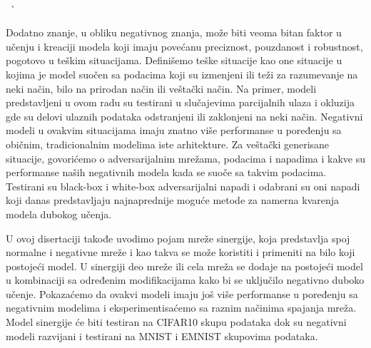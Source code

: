 \begin{tabbing}
\begin{minipage}[t]{.8\textwidth}
\end{minipage}\\

\ \`
\begin{minipage}[t]{.8\textwidth}
  Dodatno znanje, u obliku negativnog znanja, može biti veoma bitan faktor u učenju i kreaciji modela koji imaju povećanu preciznost, pouzdanost i robustnost, pogotovo u teškim situacijama. Definišemo teške situacije kao one situacije u kojima je model suočen sa podacima koji su izmenjeni ili teži za razumevanje na neki način, bilo na prirodan način ili veštački način. Na primer, modeli predstavljeni u ovom radu su testirani u slučajevima parcijalnih ulaza i okluzija gde su delovi ulaznih podataka odstranjeni ili zaklonjeni na neki način. Negativni modeli u ovakvim situacijama imaju znatno više performanse u poređenju sa običnim, tradicionalnim modelima iste arhitekture. Za veštački generisane situacije, govorićemo o adversarijalnim mrežama, podacima i napadima i kakve su performanse naših negativnih modela kada se suoče sa takvim podacima. Testirani su black-box i white-box adversarijalni napadi i odabrani su oni napadi koji danas predstavljaju najnaprednije moguće metode za namerna kvarenja modela dubokog učenja.

U ovoj disertaciji takođe uvodimo pojam mreže sinergije, koja predstavlja spoj normalne i negativne mreže i kao takva se može koristiti i primeniti na bilo koji postojeći model. U sinergiji deo mreže ili cela mreža se dodaje na postojeći model u kombinaciji sa određenim modifikacijama kako bi se uključilo negativno duboko učenje. Pokazaćemo da ovakvi modeli imaju još više performanse u poređenju sa negativnim modelima i eksperimentisaćemo sa raznim načinima spajanja mreža. Model sinergije će biti testiran na CIFAR10 skupu podataka dok su negativni modeli razvijani i testirani na MNIST i EMNIST skupovima podataka.


\end{minipage}
\end{tabbing}
